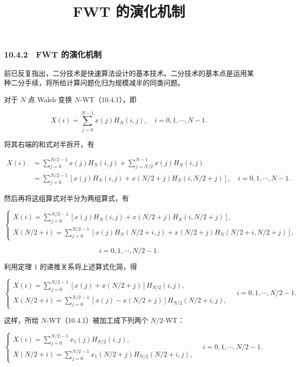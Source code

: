 \documentclass[
  10pt,
  fontset=fandol]{ctexart}
\title{FWT 的演化机制}
\author{}
\date{}
\begin{document}
\maketitle

\subsubsection{10.4.2　FWT 的演化机制}\label{fwt-ux7684ux6f14ux5316ux673aux5236}

前已反复指出，二分技术是快速算法设计的基本技术。二分技术的基本点是运用某种二分手续，将所给计算问题化归为规模减半的同类问题。

对于 \(N\) 点 Walsh 变换 \(N\)-WT（10.4.1），即

\[
X(i)=\sum_{j=0}^{N-1}x(j)H_N(i,j),\quad i=0,1,\cdots,N-1.
\]

将其右端的和式对半拆开，有

\[
\begin{aligned}
X(i)&=\sum_{j=0}^{N/2-1}x(j)H_N(i,j)+\sum_{j=N/2}^{N-1}x(j)H_N(i,j)\\
&=\sum_{j=0}^{N/2-1}[x(j)H_N(i,j)+x(N/2+j)H_N(i,N/2+j)],\quad i=0,1,\cdots,N-1.
\end{aligned}
\]

然后再将这组算式对半分为两组算式，有

\[
\begin{cases}
\displaystyle X(i)=\sum_{j=0}^{N/2-1}[x(j)H_N(i,j)+x(N/2+j)H_N(i,N/2+j)],\\[6pt]
\displaystyle X(N/2+i)=\sum_{j=0}^{N/2-1}[x(j)H_N(N/2+i,j)+x(N/2+j)H_N(N/2+i,N/2+j)],
\end{cases}
\]

\[
i=0,1,\cdots,N/2-1.
\]

利用定理 1 的递推关系将上述算式化简，得

\[
\begin{cases}
\displaystyle X(i)=\sum_{j=0}^{N/2-1}[x(j)+x(N/2+j)]H_{N/2}(i,j),\\[6pt]
\displaystyle X(N/2+i)=\sum_{j=0}^{N/2-1}[x(j)-x(N/2+j)]H_{N/2}(N/2+i,j),
\end{cases}\quad i=0,1,\cdots,N/2-1.
\]

这样，所给 \(N\)-WT（10.4.1）被加工成下列两个 \(N/2\)-WT：

\[
\begin{cases}
\displaystyle X(i)=\sum_{j=0}^{N/2-1}x_1(j)H_{N/2}(i,j),\\[6pt]
\displaystyle X(N/2+i)=\sum_{j=0}^{N/2-1}x_1(N/2+j)H_{N/2}(N/2+i,j),
\end{cases}\quad i=0,1,\cdots,N/2-1.
\]
\end{document}
